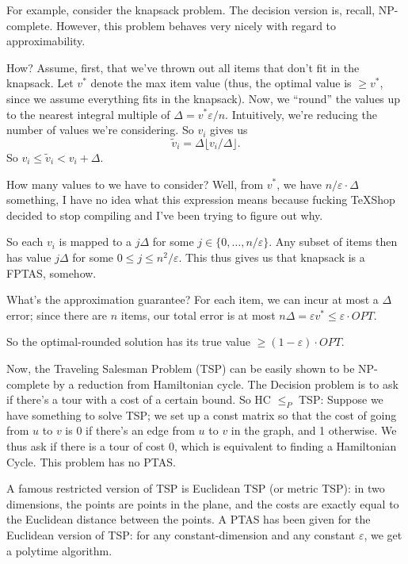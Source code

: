 \documentclass{article}
\begin{document}
For example, consider the knapsack problem. The decision version is, recall,
NP-complete. However, this problem behaves very nicely with regard to
approximability.

How? Assume, first, that we've thrown out all items that don't fit in the
knapsack.
Let $v^*$ denote the max item value (thus, the optimal value is
$\geq v^*$, since we assume everything fits in the knapsack).
Now, we ``round'' the values up to the nearest integral multiple of 
$\Delta = v^* \varepsilon /n$. Intuitively, we're reducing the number of
values we're considering. So $v_i$ gives us 
$$
\tilde v_i =
\Delta 
\lfloor
v_i / \Delta
\rfloor.
$$
So $v_i \leq \tilde v_i < v_i + \Delta$.

How many values to we have to consider? Well, from $v^*$, we have
$n/\varepsilon \cdot \Delta$ something, I have no idea what this expression
means because fucking TeXShop decided to stop compiling and I've been trying
to figure out why.

So each $v_i$ is mapped to a $j\Delta$ for some $j\in \{0,\ldots, n/\varepsilon
\}$.
Any subset of items then has value $j\Delta$ for some $0\leq j \leq n^2 / 
\varepsilon$.
This thus gives us that knapsack is a FPTAS, somehow.

What's the approximation guarantee? For each item, we can incur at most
a $\Delta$ error; since there are $n$ items, our total error is at most
$n\Delta = \varepsilon v^* \leq \varepsilon \cdot OPT$.

So the optimal-rounded solution has its true value $\geq (1-\varepsilon)\cdot 
OPT$.

Now, the Traveling Salesman Problem (TSP) can be easily shown to be 
NP-complete by a reduction from Hamiltonian cycle. The Decision problem is
to ask if there's a tour with a cost of a certain bound.
So HC $\leq_P$ TSP: Suppose we have something to solve TSP; we set up a 
const matrix so that the cost of going from $u$ to $v$ is 0 if there's
an edge from $u$ to $v$ in the graph, and 1 otherwise. We thus ask if there
is a tour of cost 0, which is equivalent to finding a Hamiltonian Cycle.
This problem has no PTAS.

A famous restricted version of TSP is Euclidean TSP (or metric TSP): in two 
dimensions,
the points are points in the plane, and the costs are exactly equal to the
Euclidean distance between the points. A PTAS has been given for the
Euclidean version of TSP: for any constant-dimension and any constant 
$\varepsilon$, we get a polytime algorithm.
\end{document}
